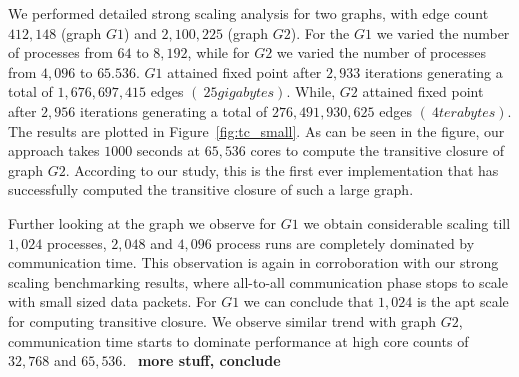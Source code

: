 
We performed detailed strong scaling analysis for two graphs, with edge count $412,148$ (graph $G1$) and $2,100,225$ (graph $G2$).
For the $G1$ we varied the number of processes from $64$ to $8,192$, while for $G2$ we varied the number of processes from $4,096$ to $65.536$. 
$G1$ attained fixed point after $2,933$ iterations generating a total of $1,676,697,415$ edges $(~25 gigabytes)$.
While, $G2$ attained fixed point after $2,956$ iterations generating a total of $276,491,930,625$ edges $(~4 terabytes)$.
The results are plotted in Figure~\ref{fig:tc_small}. As can be seen in the figure, our approach takes $1000$ seconds at $65,536$ cores to compute the transitive closure of graph $G2$. According to our study, this is the first ever implementation that has successfully computed the transitive closure of such a large graph.

Further looking at the graph we observe for $G1$ we obtain considerable scaling till $1,024$ processes, $2,048$ and $4,096$ process runs are completely dominated by communication time. This observation is again in corroboration with our strong scaling benchmarking results, where all-to-all communication phase stops to scale with small sized data packets. For $G1$ we can conclude that $1,024$ is the apt scale for computing transitive closure.
We observe similar trend with graph $G2$, communication time starts to dominate performance at high core counts of $32,768$ and $65,536$. ~\textbf{more stuff, conclude}




